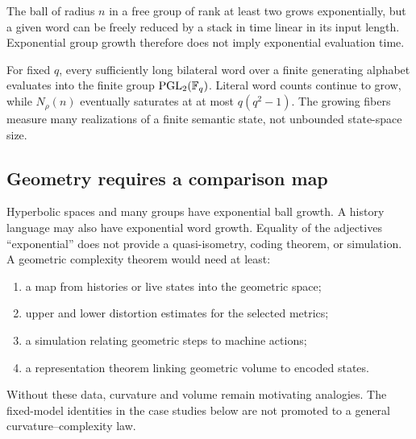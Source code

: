 \begin{example}
The ball of radius $n$ in a free group of rank at least two grows
exponentially, but a given word can be freely reduced by a stack in time linear
in its input length.  Exponential group growth therefore does not imply
exponential evaluation time.
\end{example}

\begin{example}
For fixed $q$, every sufficiently long bilateral word over a finite generating
alphabet evaluates into the finite group $\operatorname{PGL}_2(\mathbb{F}_q)$.  Literal word counts
continue to grow, while $N_\rho(n)$ eventually saturates at at most
$q(q^2-1)$.  The growing fibers measure many realizations of a finite semantic
state, not unbounded state-space size.
\end{example}

\subsection{Geometry requires a comparison map}

Hyperbolic spaces and many groups have exponential ball growth.  A history
language may also have exponential word growth.  Equality of the adjectives
``exponential'' does not provide a quasi-isometry, coding theorem, or
simulation.  A geometric complexity theorem would need at least:

\begin{enumerate}
  \item a map from histories or live states into the geometric space;
  \item upper and lower distortion estimates for the selected metrics;
  \item a simulation relating geometric steps to machine actions;
  \item a representation theorem linking geometric volume to encoded states.
\end{enumerate}

Without these data, curvature and volume remain motivating analogies.  The
fixed-model identities in the case studies below are not promoted to a general
curvature--complexity law.
